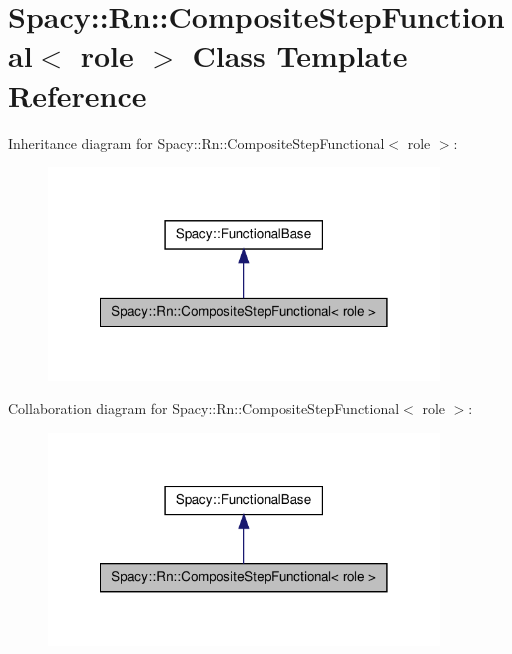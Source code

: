 \hypertarget{classSpacy_1_1Rn_1_1CompositeStepFunctional}{\section{\-Spacy\-:\-:\-Rn\-:\-:\-Composite\-Step\-Functional$<$ role $>$ \-Class \-Template \-Reference}
\label{classSpacy_1_1Rn_1_1CompositeStepFunctional}
}


\-Inheritance diagram for \-Spacy\-:\-:\-Rn\-:\-:\-Composite\-Step\-Functional$<$ role $>$\-:
\nopagebreak
\begin{figure}[H]
\begin{center}
\leavevmode
\includegraphics[width=294pt]{classSpacy_1_1Rn_1_1CompositeStepFunctional__inherit__graph}
\end{center}
\end{figure}


\-Collaboration diagram for \-Spacy\-:\-:\-Rn\-:\-:\-Composite\-Step\-Functional$<$ role $>$\-:
\nopagebreak
\begin{figure}[H]
\begin{center}
\leavevmode
\includegraphics[width=294pt]{classSpacy_1_1Rn_1_1CompositeStepFunctional__coll__graph}
\end{center}
\end{figure}
